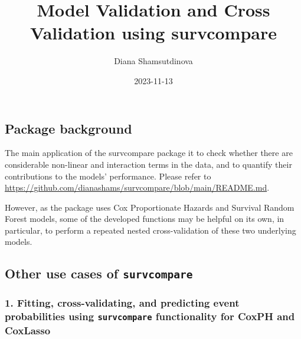\documentclass[
]{article}
\title{Model Validation and Cross Validation using survcompare}
\author{Diana Shamsutdinova}
\date{2023-11-13}
\begin{document}
\maketitle

\hypertarget{package-background}{%
\subsection{Package background}\label{package-background}}

The main application of the survcompare package it to check whether
there are considerable non-linear and interaction terms in the data, and
to quantify their contributions to the models' performance. Please refer
to \url{https://github.com/dianashams/survcompare/blob/main/README.md}.

However, as the package uses Cox Proportionate Hazards and Survival
Random Forest models, some of the developed functions may be helpful on
its own, in particular, to perform a repeated nested cross-validation of
these two underlying models.

\hypertarget{other-use-cases-of-survcompare}{%
\subsection{\texorpdfstring{Other use cases of
\texttt{survcompare}}{Other use cases of survcompare}}\label{other-use-cases-of-survcompare}}

\hypertarget{fitting-cross-validating-and-predicting-event-probabilities-using-survcompare-functionality-for-coxph-and-coxlasso}{%
\subsubsection{\texorpdfstring{1. Fitting, cross-validating, and
predicting event probabilities using \texttt{survcompare} functionality
for CoxPH and
CoxLasso}{1. Fitting, cross-validating, and predicting event probabilities using survcompare functionality for CoxPH and CoxLasso}}\label{fitting-cross-validating-and-predicting-event-probabilities-using-survcompare-functionality-for-coxph-and-coxlasso}}
\end{document}
